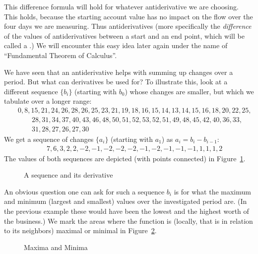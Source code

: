 This difference formula will hold for whatever antiderivative we are
choosing. This holds, because the starting account value has no impact on
the flow over the four days we are measuring. Thus antiderivatives (more
specifically the {\em difference} of the values of antiderivatives between a
start and an end point, which will be called a .)
We will encounter this easy idea later again under the name of
``Fundamental Theorem of Calculus''.
\medskip

We have seen that an antiderivative helps with summing up changes over a
period. But what can derivatives be used for? To illustrate this, look at
a different sequence $\{b_i\}$ (starting with $b_0$) whose changes are smaller, but which we tabulate
over a longer range:
\begin{eqnarray*}
&&
 0, 8, 15, 21, 24, 26, 28, 26, 25, 23, 21, 19, 18, 16, 15, 14, 13, 14, 15,
  16, 18, 20, 22, 25,\\
 &&\qquad 28, 31, 34, 37, 40, 43, 46, 48, 50, 51, 52, 53, 52, 51,
  49, 48, 45, 42, 40, 36, 33,\\
  &&\qquad 31, 28, 27, 26, 27, 30 
\end{eqnarray*}
We get a sequence of changes $\{a_i\}$ (starting with $a_1$) as
$a_i=b_i-b_{i-1}$:
\begin{eqnarray*}
&&
7, 6, 3, 2, 2, -2, -1, -2, -2, -2, -1, -2, -1, -1, -1, 1, 1, 1, 2
\end{eqnarray*}
The values of both sequences are depicted (with points connected) in
Figure~\ref{figpythder}.

\begin{figure}
\begin{center}
\end{center}
\caption{A sequence and its derivative}
\label{figpythder}
\end{figure}

An obvious question one can ask for such a sequence $b_i$ is for what the
maximum and minimum (largest and smallest) values over the investigated
period are.
(In the previous example these would have been the lowest and the highest
worth of the business.) We mark the areas where the function is (locally,
that is in relation to its neighbors) maximal or minimal in
Figure~\ref{figpythder2}.

\begin{figure}
\begin{center}
\end{center}
\caption{Maxima and Minima}
\label{figpythder2}
\end{figure}

